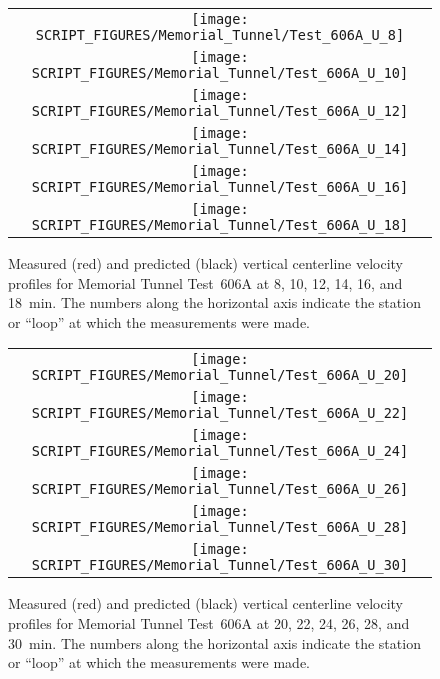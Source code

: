 \begin{figure}[p]
\begin{tabular*}{\textwidth}{c}
\texttt{[image: SCRIPT\_FIGURES/Memorial\_Tunnel/Test\_606A\_U\_8]} \\
\texttt{[image: SCRIPT\_FIGURES/Memorial\_Tunnel/Test\_606A\_U\_10]} \\
\texttt{[image: SCRIPT\_FIGURES/Memorial\_Tunnel/Test\_606A\_U\_12]} \\
\texttt{[image: SCRIPT\_FIGURES/Memorial\_Tunnel/Test\_606A\_U\_14]} \\
\texttt{[image: SCRIPT\_FIGURES/Memorial\_Tunnel/Test\_606A\_U\_16]} \\
\texttt{[image: SCRIPT\_FIGURES/Memorial\_Tunnel/Test\_606A\_U\_18]}
\end{tabular*}
\caption[Memorial Tunnel experiments, velocity profiles, Test 606A, 8-18 min]{Measured (red) and predicted (black) vertical centerline velocity profiles for Memorial Tunnel Test~606A at 8, 10, 12, 14, 16, and 18~min. The numbers along the horizontal axis indicate the station or ``loop'' at which the measurements were made.}
\label{Memorial_606A_U_8-18}
\end{figure}

\begin{figure}[p]
\begin{tabular*}{\textwidth}{c}
\texttt{[image: SCRIPT\_FIGURES/Memorial\_Tunnel/Test\_606A\_U\_20]} \\
\texttt{[image: SCRIPT\_FIGURES/Memorial\_Tunnel/Test\_606A\_U\_22]} \\
\texttt{[image: SCRIPT\_FIGURES/Memorial\_Tunnel/Test\_606A\_U\_24]} \\
\texttt{[image: SCRIPT\_FIGURES/Memorial\_Tunnel/Test\_606A\_U\_26]} \\
\texttt{[image: SCRIPT\_FIGURES/Memorial\_Tunnel/Test\_606A\_U\_28]} \\
\texttt{[image: SCRIPT\_FIGURES/Memorial\_Tunnel/Test\_606A\_U\_30]}
\end{tabular*}
\caption[Memorial Tunnel experiments, velocity profiles, Test 606A, 20-30 min]{Measured (red) and predicted (black) vertical centerline velocity profiles for Memorial Tunnel Test~606A at 20, 22, 24, 26, 28, and 30~min. The numbers along the horizontal axis indicate the station or ``loop'' at which the measurements were made.}
\label{Memorial_606A_U_20-30}
\end{figure}


